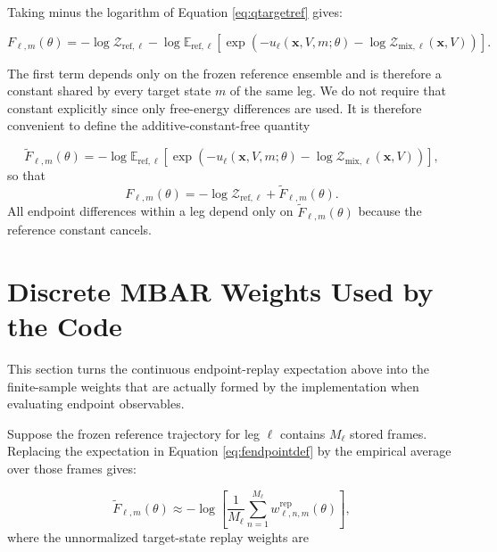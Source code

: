 Taking minus the logarithm of Equation \eqref{eq:qtargetref} gives:

\begin{equation}
    F_{\ell,m}(\theta)
    =
    -\log \mathcal{Z}_{\mathrm{ref},\ell}
    -
    \log
    \mathbb{E}_{\mathrm{ref},\ell}
    \left[
        \exp \left(
            -u_\ell(\mathbf{x}, V, m; \theta)
            -
            \log \mathcal{Z}_{\mathrm{mix},\ell}(\mathbf{x}, V)
        \right)
    \right].
    \label{eq:freeref}
\end{equation}

The first term depends only on the frozen reference ensemble and is therefore a constant shared by every target state $m$ of the same leg. We do not require that constant explicitly since only free-energy differences are used. It is therefore convenient to define the additive-constant-free quantity

\begin{equation}
    \widetilde{F}_{\ell,m}(\theta)
    =
    -
    \log
    \mathbb{E}_{\mathrm{ref},\ell}
    \left[
        \exp \left(
            -u_\ell(\mathbf{x}, V, m; \theta)
            -
            \log \mathcal{Z}_{\mathrm{mix},\ell}(\mathbf{x}, V)
        \right)
    \right],
    \label{eq:fendpointdef}
\end{equation}
%
so that
%
\begin{equation}
    F_{\ell,m}(\theta)
    =
    -\log \mathcal{Z}_{\mathrm{ref},\ell}
    +
    \widetilde{F}_{\ell,m}(\theta).
    \label{eq:fendpointconst}
\end{equation}
%
All endpoint differences within a leg depend only on $\widetilde{F}_{\ell,m}(\theta)$ because the reference constant cancels.

\section{Discrete MBAR Weights Used by the Code}

This section turns the continuous endpoint-replay expectation above into the finite-sample weights that are actually formed by the implementation when evaluating endpoint observables.

Suppose the frozen reference trajectory for leg $\ell$ contains $M_\ell$ stored frames. Replacing the expectation in Equation \eqref{eq:fendpointdef} by the empirical average over those frames gives:

\begin{equation}
    \widetilde{F}_{\ell,m}(\theta)
    \approx
    -
    \log
    \left[
        \frac{1}{M_\ell}
        \sum_{n=1}^{M_\ell}
        w^{\mathrm{rep}}_{\ell,n,m}(\theta)
    \right],
    \label{eq:fendpointdisc}
\end{equation}
%
where the unnormalized target-state replay weights are

